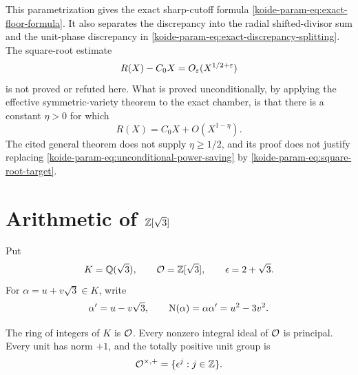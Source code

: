 This parametrization gives the exact sharp-cutoff formula
\eqref{koide-param-eq:exact-floor-formula}.  It also separates the discrepancy into
the radial shifted-divisor sum and the unit-phase discrepancy in
\eqref{koide-param-eq:exact-discrepancy-splitting}.  The square-root estimate
\begin{equation}
 R(X)-C_0X=O_\varepsilon(X^{1/2+\varepsilon})
 \label{koide-param-eq:square-root-target}
\end{equation}
is not proved or refuted here.  What is proved unconditionally, by applying
the effective symmetric-variety theorem to the exact chamber, is that
there is a constant $\eta>0$ for which
\begin{equation}
 R(X)=C_0X+O(X^{1-\eta}).
 \label{koide-param-eq:unconditional-power-saving}
\end{equation}
The cited general theorem does not supply $\eta\geq1/2$, and its proof does
not justify replacing \eqref{koide-param-eq:unconditional-power-saving} by
\eqref{koide-param-eq:square-root-target}.

\section{Arithmetic of $\mathbb Z[\sqrt3]$}

Put
\begin{equation}
 K=\mathbb Q(\sqrt3),\qquad \mathcal O=\mathbb Z[\sqrt3],\qquad
 \epsilon=2+\sqrt3.
 \label{koide-param-eq:field-data}
\end{equation}
For $\alpha=u+v\sqrt3\in K$, write
\begin{equation}
 \alpha'=u-v\sqrt3,
 \qquad
 \operatorname N(\alpha)=\alpha\alpha'=u^2-3v^2.
 \label{koide-param-eq:conjugate-norm}
\end{equation}

\begin{lemma}
\label{koide-param-lem:ring-units}
The ring of integers of $K$ is $\mathcal O$.  Every nonzero integral ideal of
$\mathcal O$ is principal.  Every unit has norm $+1$, and the totally positive
unit group is
\begin{equation}
 \mathcal O^{\times,+}=\{\epsilon^j:j\in\mathbb Z\}.
 \label{koide-param-eq:positive-units}
\end{equation}
\end{lemma}

